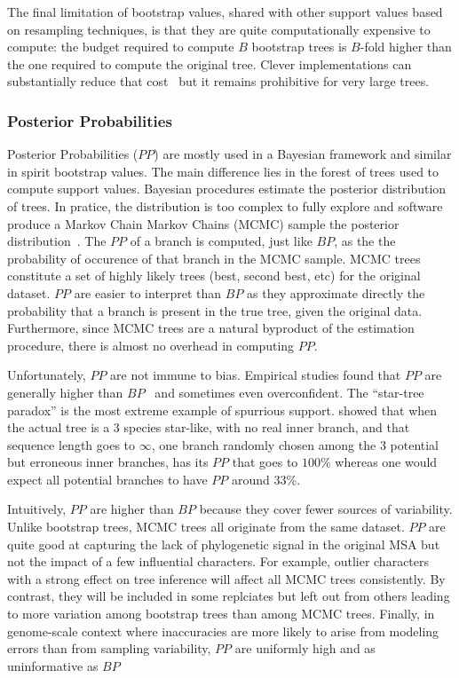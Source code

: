 The final limitation of bootstrap values, shared with other support values based on resampling techniques, is that they are quite computationally expensive to compute: the budget required to compute $B$ bootstrap trees is $B$-fold higher than the one required to compute the original tree. Clever implementations can substantially reduce that cost~\citep{Stamatakis2014} but it remains prohibitive for very large trees. 

\subsubsection{Posterior Probabilities} \label{sec:posterior-probabilities}

Posterior Probabilities ($PP$) are mostly used in a Bayesian framework and similar in spirit bootstrap values. The main difference lies in the forest of trees used to compute support values. Bayesian procedures estimate the posterior distribution of trees. In pratice, the distribution is too complex to fully explore and software produce a Markov Chain Markov Chains (MCMC) sample the posterior distribution~\citep{Yang1997a}. The $PP$ of a branch is computed, just like $BP$, as the the probability of occurence of that branch in the MCMC sample. MCMC trees constitute a set of highly likely trees (best, second best, etc) for the original dataset. $PP$ are easier to interpret than $BP$ as they approximate directly the probability that a branch is present in the true tree, given the original data. Furthermore, since MCMC trees are a natural byproduct of the estimation procedure, there is almost no overhead in computing $PP$. 

Unfortunately, $PP$ are not immune to bias. Empirical studies found that $PP$ are generally higher than $BP$~\citep{Anisimova2011} and sometimes even overconfident. The ``star-tree paradox'' \citep{Yang2007} is the most extreme example of spurrious support. \citet{Yang2007} showed that when the actual tree is a 3 species star-like, with no real inner branch, and that sequence length goes to $\infty$, one branch randomly chosen among the 3 potential but erroneous inner branches, has its $PP$ that goes to $100$\% whereas one would expect all potential branches to have $PP$ around $33$\%. 

Intuitively, $PP$ are higher than $BP$ because they cover fewer sources of variability. Unlike bootstrap trees, MCMC trees all originate from the same dataset. $PP$ are quite good at capturing the lack of phylogenetic signal in the original MSA but not the impact of a few influential characters. For example, outlier characters with a strong effect on tree inference will affect all MCMC trees consistently. By contrast, they will be included in some replciates but left out from others leading to more variation among bootstrap trees than among MCMC trees. Finally, in genome-scale context where inaccuracies are more likely to arise from modeling errors than from sampling variability, $PP$ are uniformly high and as uninformative as $BP$~\citep{Philippe2011, Kumar2012}

